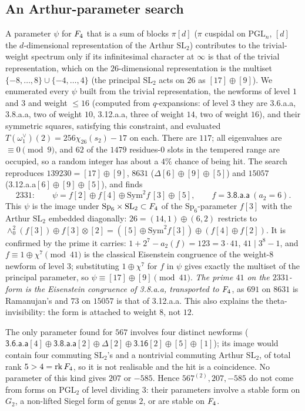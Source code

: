 \documentclass[11pt]{amsart}
\theoremstyle{definition}
\begin{document}
\subsection{An Arthur-parameter search}\label{sec:arthur} A parameter $\psi$ for $F_4$ that is a sum of blocks $\pi[d]$ ($\pi$ cuspidal on $\mathrm{PGL}_n$, $[d]$ the $d$-dimensional representation of the Arthur $\mathrm{SL}_2$) contributes to the trivial-weight spectrum only if its infinitesimal character at $\infty$ is that of the trivial representation, which on the $26$-dimensional representation is the multiset $\{-8,\dots,8\}\cup\{-4,\dots,4\}$ (the principal $\mathrm{SL}_2$ acts on $26$ as $[17]\oplus[9]$). We enumerated every $\psi$ built from the trivial representation, the newforms of level $1$ and $3$ and weight $\le16$ (computed from $q$-expansions: of level $3$ they are \textsf{3.6.a.a}, \textsf{3.8.a.a}, two of weight $10$, \textsf{3.12.a.a}, three of weight $14$, two of weight $16$), and their symmetric squares, satisfying this constraint, and evaluated $T(\omega_1^\vee)(2)=256\chi_{26}(s_2)-17$ on each. There are $117$; all eigenvalues are $\equiv0\pmod9$, and $62$ of the $1479$ residues-$0$ slots in the tempered range are occupied, so a random integer has about a $4\%$ chance of being hit. The search reproduces $139230=[17]\oplus[9]$, $8631$ ($\Delta[6]\oplus[9]\oplus[5]$) and $15057$ (\textsf{3.12.a.a}$[6]\oplus[9]\oplus[5]$), and finds
\[2331:\qquad \psi=f[2]\oplus f[4]\oplus\mathrm{Sym}^2f\,[3]\oplus[5],\qquad f=\textsf{3.8.a.a}\ (a_2=6).\]
This $\psi$ is the image under $\mathrm{Sp}_6\times\mathrm{SL}_2\subset F_4$ of the $\mathrm{Sp}_6$-parameter $f[3]$ with the Arthur $\mathrm{SL}_2$ embedded diagonally: $26=(14,1)\oplus(6,2)$ restricts to $\wedge^2_0(f[3])\oplus f[3]\otimes[2]=([5]\oplus\mathrm{Sym}^2f[3])\oplus(f[4]\oplus f[2])$. It is confirmed by the prime it carries: $1+2^7-a_2(f)=123=3\cdot41$, $41\mid3^8-1$, and $f\equiv1\oplus\chi^7\pmod{41}$ is the classical Eisenstein congruence of the weight-$8$ newform of level $3$; substituting $1\oplus\chi^7$ for $f$ in $\psi$ gives exactly the multiset of the principal parameter, so $\psi\equiv[17]\oplus[9]\pmod{41}$. \emph{The prime $41$ on the $2331$-form is the Eisenstein congruence of \textsf{3.8.a.a}, transported to $F_4$}, as $691$ on $8631$ is Ramanujan's and $73$ on $15057$ is that of \textsf{3.12.a.a}. This also explains the theta-invisibility: the form is attached to weight $8$, not $12$.

The only parameter found for $567$ involves four distinct newforms ($\textsf{3.6.a.a}[4]\oplus\textsf{3.8.a.a}[2]\oplus\Delta[2]\oplus\textsf{3.16}[2]\oplus[5]\oplus[1]$); its image would contain four commuting $\mathrm{SL}_2$'s and a nontrivial commuting Arthur $\mathrm{SL}_2$, of total rank $5>4=\operatorname{rk}F_4$, so it is not realisable and the hit is a coincidence. No parameter of this kind gives $207$ or $-585$. Hence $567^{(2)},207,-585$ do not come from forms on $\mathrm{PGL}_2$ of level dividing $3$: their parameters involve a stable form on $G_2$, a non-lifted Siegel form of genus $2$, or are stable on $F_4$.
\end{document}
